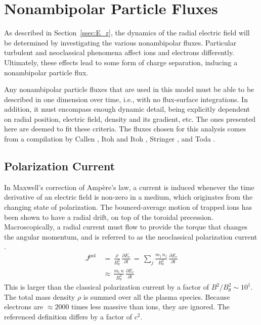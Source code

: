 \section{Nonambipolar Particle Fluxes}\label{sec:nonambipolar_fluxes}
As described in Section~\ref{ssec:E_r}, the dynamics of the radial electric field will be determined by investigating the various nonambipolar fluxes.
Particular turbulent and neoclassical phenomena affect ions and electrons differently.
Ultimately, these effects lead to some form of charge separation, inducing a nonambipolar particle flux.

Any nonambipolar particle fluxes that are used in this model must be able to be described in one dimension over time, i.e., with no flux-surface integrations.
In addition, it must encompass enough dynamic detail, being explicitly dependent on radial position, electric field, density and its gradient, etc.
The ones presented here are deemed to fit these criteria.
The fluxes chosen for this analysis comes from a compilation by Callen \cite{callen_toroidal_2009}, Itoh and Itoh \cite{itoh_role_1996}, Stringer \cite{stringer_explanation_1993}, and Toda \cite{toda_theoretical_1997}.

\subsection{Polarization Current}\label{ssec:polarization_current}
In Maxwell's correction of Amp\`ere's law, a current is induced whenever the time derivative of an electric field is non-zero in a medium, which originates from the changing state of polarization.
The bounced-average motion of trapped ions has been shown to have a radial drift, on top of the toroidal precession.
Macroscopically, a radial current must flow to provide the torque that changes the angular momentum, and is referred to as the neoclassical polarization current \cite{hinton_neoclassical_1984}.
\begin{align} %
	J^\text{pol} \,&=\, \frac{\rho}{B_\theta^2} \,
		\frac{\partial E_r}{\partial t} \,=\, \sum_j \frac{m_j \, n_j }
		{B_\theta^2} \, \frac{\partial E_r}{\partial t} \\
	\,&\approx\, \frac{m_i \, n}{B_\theta^2} \, \frac{\partial E_r}{\partial t}
		\label{eq:polarization_current_original}
\end{align}
This is larger than the classical polarization current by a factor of $B^2 / B_\theta^2 \sim 10^1$.
The total mass density $\rho$ is summed over all the plasma species.
Because electrons are $\approx 2000$ times less massive than ions, they are ignored.
The referenced definition differs by a factor of $c^2$.

